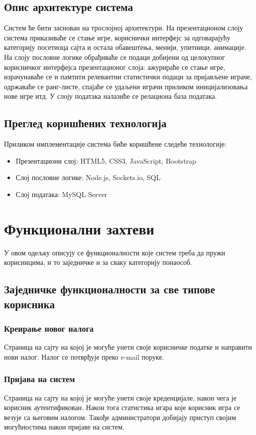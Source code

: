 \subsection{Опис архитектуре система}
Систем ће бити заснован на трослојној архитектури. На презентационом слоју система приказиваће се стање игре,
кориснички интерфејс за одговарајућу категорију посетиоца сајта и остала обавештења, менији, упитници, анимације.
На слоју пословне логике обрађиваће се подаци добијени од целокупног корисничког интерфејса презентационог слоја:
ажурираће се стање игре, израчунаваће се и памтити релевантни статистички подаци за пријављене играче, одржаваће
се ранг-листе, спајаће се удаљени играчи приликом иницијализовања нове игре итд. У слоју података налазиће се
релациона база података.

\subsection{Преглед коришћених технологија}
Приликом имплементације система биће коришћене следеће технологије:
\begin{itemize}
    \item Презентациони слој: HTML5, CSS3, JavaScript, Bootstrap
    \item Слој пословне логике: Node.js, Sockets.io, SQL
    \item Слој података: MySQL Server
\end{itemize}



\section{Функционални захтеви} 
У овом одељку описују се функционалности које систем треба да пружи корисницима, и то заједничке и за сваку
категорију понаособ.

\subsection{Заједничке функционалности за све типове корисника}

\subsubsection{Креирање новог налога}
Страница на сајту на којој је могуће унети своје корисничке податке и направити нови налог. Налог се потврђује
преко e-mail поруке.

\subsubsection{Пријава на систем}
Страница на сајту на којој је могуће унети своје креденцијале, након чега је корисник аутентификован. Након тога
статистика игара које корисник игра се везује са његовим налогом. Такође администратори добијају приступ својим
могућностима након пријаве на систем.

